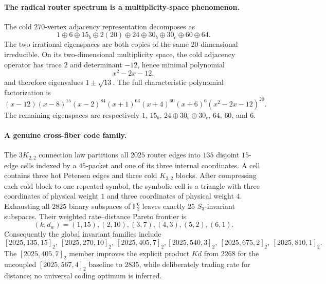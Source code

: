 \paragraph{The radical router spectrum is a multiplicity-space phenomenon.}
The cold $270$-vertex adjacency representation decomposes as
\[
  1\oplus 6\oplus 15_b\oplus 2(20)\oplus24\oplus30_b\oplus30_c\oplus60\oplus64.
\]
The two irrational eigenspaces are both copies of the same $20$-dimensional irreducible.  On its two-dimensional multiplicity space, the cold adjacency operator has trace $2$ and determinant $-12$, hence minimal polynomial
\[
  x^2-2x-12,
\]
and therefore eigenvalues $1\pm\sqrt{13}$.  The full characteristic polynomial factorization is
\[
 (x-12)(x-8)^{15}(x-2)^{84}(x+1)^{64}(x+4)^{60}(x+6)^6
 (x^2-2x-12)^{20}.
\]
The remaining eigenspaces are respectively $1$, $15_b$, $24\oplus30_b\oplus30_c$, $64$, $60$, and $6$.

\paragraph{A genuine cross-fiber code family.}
The $3K_{2,2}$ connection law partitions all $2025$ router edges into $135$ disjoint $15$-edge cells indexed by a $45$-packet and one of its three internal coordinates.  A cell contains three hot Petersen edges and three cold $K_{2,2}$ blocks.  After compressing each cold block to one repeated symbol, the symbolic cell is a triangle with three coordinates of physical weight $1$ and three coordinates of physical weight $4$.  Exhausting all $2825$ binary subspaces of $\mathbb F_2^6$ leaves exactly $25$ $S_3$-invariant subspaces.  Their weighted rate--distance Pareto frontier is
\[
  (k,d_w)=(1,15),(2,10),(3,7),(4,3),(5,2),(6,1).
\]
Consequently the global invariant families include
\[
 [2025,135,15]_2,\ [2025,270,10]_2,\ [2025,405,7]_2,
 [2025,540,3]_2,\ [2025,675,2]_2,\ [2025,810,1]_2.
\]
The $[2025,405,7]_2$ member improves the explicit product $K d$ from $2268$ for the uncoupled $[2025,567,4]_2$ baseline to $2835$, while deliberately trading rate for distance; no universal coding optimum is inferred.

